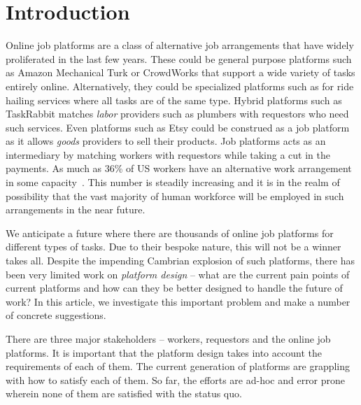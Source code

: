 \section{Introduction}
\label{sec:introduction}

Online job platforms are a class of alternative job arrangements that have widely
proliferated in the last few years.
These could be general purpose platforms such as
Amazon Mechanical Turk or CrowdWorks that support a wide variety of tasks entirely online.
Alternatively, they could be specialized platforms such as for ride hailing services
where all tasks are of the same type.
Hybrid platforms such as TaskRabbit matches \emph{labor} providers
such as plumbers with requestors who need such services.
Even platforms such as Etsy could be construed as a job platform
as it allows \emph{goods} providers to sell their products.
Job platforms acts as an intermediary by matching workers with requestors
while taking a cut in the payments.
As much as 36\% of US workers have an alternative work arrangement in some capacity~\cite{mcfeely2018workplace}.
This number is steadily increasing and it is in the realm of possibility
that the vast majority of human workforce will be employed in such arrangements in the near future.

We anticipate a future where there are thousands of online job platforms
for different types of tasks.
Due to their bespoke nature, this will not be a winner takes all.
Despite the impending Cambrian explosion of such platforms,
there has been very limited work on \emph{platform design} --
what are the current pain points of current platforms
and how can they be better designed to handle the future of work?
In this article, we investigate this important problem and make a number of concrete suggestions.

There are three major stakeholders -- workers, requestors and the online job platforms. 
It is important that the platform design takes into account the requirements of each of them.
The current generation of platforms are grappling with how to satisfy each of them.
So far, the efforts are ad-hoc and error prone wherein none of them are satisfied with the status quo.

